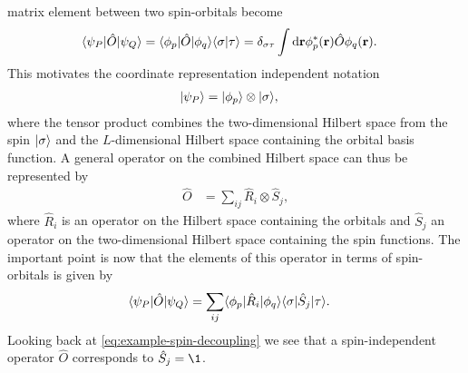         matrix element between two spin-orbitals become
        \begin{align}
            \langle \psi_P |\hat{O}| \psi_Q \rangle
            &= \langle \phi_p |\hat{O}| \phi_q \rangle\langle \sigma | \tau \rangle
            = \delta_{\sigma\tau}
            \int\mathrm{d}\mathbf{r}\phi^{*}_{p}(\mathbf{r})\hat{O}\phi_q(\mathbf{r}).
            \label{eq:example-spin-decoupling}
        \end{align}
        This motivates the coordinate representation independent notation
        \begin{align}
            | \psi_P \rangle
            &= | \phi_p \rangle\otimes| \sigma \rangle,
        \end{align}
        where the tensor product combines the two-dimensional Hilbert space from
        the spin $| \sigma \rangle$ and the $L$-dimensional Hilbert space
        containing the orbital basis function.
        A general operator on the combined Hilbert space can thus be represented
        by
        \begin{align}
            \hat{O}
            &= \sum_{ij} \hat{R}_i \otimes \hat{S}_j,
        \end{align}
        where $\hat{R}_i$ is an operator on the Hilbert space containing the
        orbitals and $\hat{S}_j$ an operator on the two-dimensional Hilbert
        space containing the spin functions.
        The important point is now that the elements of this operator in terms
        of spin-orbitals is given by
        \begin{align}
            \langle \psi_{P} |\hat{O}| \psi_{Q} \rangle
            &=
            \sum_{ij}\langle \phi_p |\hat{R}_i| \phi_q \rangle
            \langle \sigma |\hat{S}_j| \tau \rangle.
        \end{align}
        Looking back at \autoref{eq:example-spin-decoupling} we see that a
        spin-independent operator $\hat{O}$ corresponds to $\hat{S}_j = \1$.


